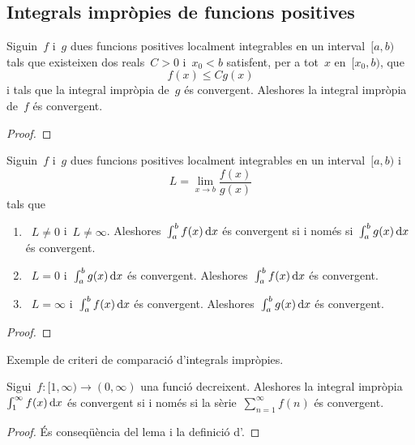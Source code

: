 \documentclass[../../main.tex]{subfiles}
\begin{document}
	\subsection{Integrals impròpies de funcions positives}
	\begin{lemma}
		\label{lema:criteri de comparació d'integrals impròpies}
		Siguin~\(f\) i~\(g\) dues funcions positives localment integrables en un interval~\([a,b)\) tals que existeixen dos reals~\(C>0\) i~\(x_{0}<b\) satisfent, per a tot~\(x\) en~\([x_{0},b)\), que
		\[
		    f(x)\leq Cg(x)
		\]
		i tals que la integral impròpia de~\(g\) és convergent.
		Aleshores la integral impròpia de~\(f\) és convergent.
		\begin{proof}
		\end{proof}
	\end{lemma}
	\begin{theorem}
		\label{def:criteri de comapració d'integrals impròpies}
		Siguin~\(f\) i~\(g\) dues funcions positives localment integrables en un interval~\([a,b)\) i
		\[
		    L=\lim_{x\to b}\frac{f(x)}{g(x)}
		\]
		tals que
		\begin{enumerate}
			\item\label{def:criteri de comapració d'integrals impròpies:eq1}~\(L\neq0\) i~\(L\neq\infty\).
			Aleshores~\(\int_{a}^{b}f(x)\mathop{}\!\mathrm{d} x\) és convergent si i només si~\(\int_{a}^{b}g(x)\mathop{}\!\mathrm{d} x\) és convergent.
			\item\label{def:criteri de comapració d'integrals impròpies:eq2}~\(L=0\) i~\(\int_{a}^{b}g(x)\mathop{}\!\mathrm{d} x\) és convergent.
			Aleshores~\(\int_{a}^{b}f(x)\mathop{}\!\mathrm{d} x\) és convergent.
			\item\label{def:criteri de comapració d'integrals impròpies:eq3}~\(L=\infty\) i~\(\int_{a}^{b}f(x)\mathop{}\!\mathrm{d} x\) és convergent.
			Aleshores~\(\int_{a}^{b}g(x)\mathop{}\!\mathrm{d} x\) és convergent.
		\end{enumerate}
		\begin{proof}
		\end{proof}
	\end{theorem}
	\begin{example}
		\label{ex:criteri de comapració d'integrals impròpies}
		Exemple de criteri de comparació d'integrals impròpies.
		\begin{solution}
		\end{solution}
	\end{example}
	\begin{theorem}
		\label{thm:criteri de la integral per integrals impròpies}
		Sigui~\(f\colon[1,\infty)\longrightarrow(0,\infty)\) una funció decreixent.
		Aleshores la integral impròpia~\(\int_{1}^{\infty}f(x)\mathop{}\!\mathrm{d} x\) és convergent si i només si la sèrie~\(\sum_{n=1}^{\infty}f(n)\) és convergent.
		\begin{proof}
			És conseqüència del lema  i la definició d'.
		\end{proof}
	\end{theorem}
\end{document}
